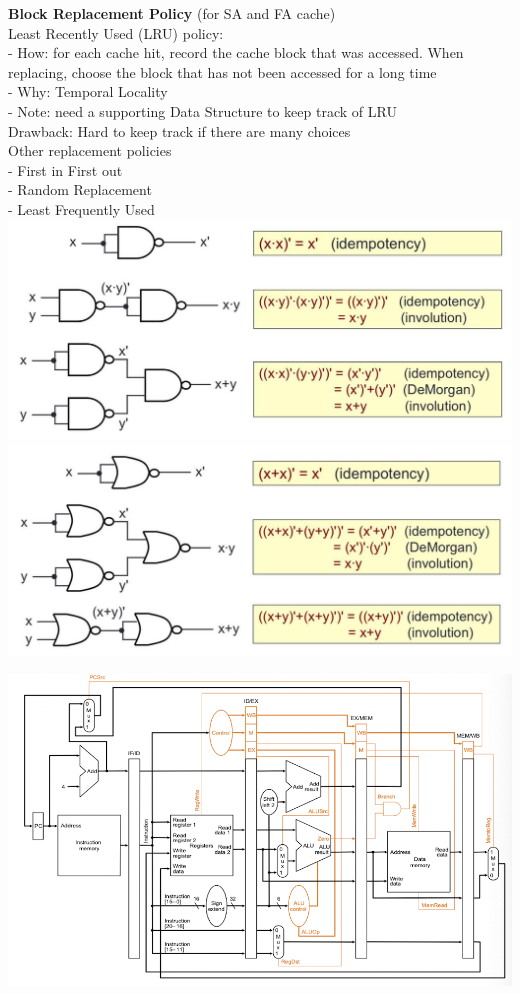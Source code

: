 \documentclass[10pt, a4paper]{article}
\newcommand{\blue}[1]{{\color{MidnightBlue}#1}}
\newcommand{\red}[1]{{\color{red}#1}}
\begin{document}
\begin{multicols*}{3}
		\textbf{Block Replacement Policy} (for SA and FA cache)\\
		Least Recently Used (LRU) policy:\\
		- \blue{How}: for each cache hit, record the cache block that was accessed. When replacing, choose the block that has not been accessed for a long time\\
		- \blue{Why}: Temporal Locality\\
		- Note: need a supporting Data Structure to keep track of LRU\\
		\red{Drawback}: Hard to keep track if there are many choices\\

		Other replacement policies\\
		- First in First out\\
		- Random Replacement\\
		- Least Frequently Used\\

		\includegraphics[scale=.28]{./assets/nandGate}\\
		\includegraphics[scale=.28]{./assets/norGate}\\

	\end{multicols*}

	\includegraphics[scale=1.5]{./assets/pipelineDatapath}\\
	
\end{document}
